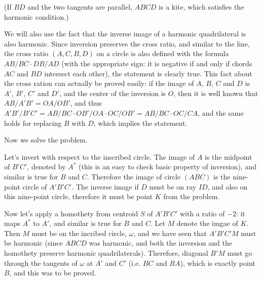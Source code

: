 \documentclass{article}
\begin{document}
(If \(\displaystyle BD\) and the two tangents are parallel, \(\displaystyle ABCD\) is a kite, which satisfies the harmonic condition.)

We will also use the fact that the inverse image of a harmonic quadrilateral is also harmonic. Since inversion preserves the cross ratio, and similar to the line, the cross ratio \(\displaystyle (A,C,B,D)\) on a circle is also defined with the formula \(\displaystyle AB/BC\cdot DB/AD\) (with the appropriate sign: it is negative if and only if chords \(\displaystyle AC\) and \(\displaystyle BD\) intersect each other), the statement is clearly true. This fact about the cross ration can actually be proved easily: if the image of \(\displaystyle A\), \(\displaystyle B\), \(\displaystyle C\) and \(\displaystyle D\) is \(\displaystyle A'\), \(\displaystyle B'\), \(\displaystyle C'\) and \(\displaystyle D'\), and the center of the inversion is \(\displaystyle O\), then it is well known that \(\displaystyle AB/A'B'=OA/OB'\), and thus \(\displaystyle A'B'/B'C'=AB/BC\cdot OB'/OA\cdot OC/OB'=AB/BC\cdot OC/CA\), and the same holds for replacing \(\displaystyle B\) with \(\displaystyle D\), which implies the statement.

Now we solve the problem.

Let's invert with respect to the inscribed circle. The image of \(\displaystyle A\) is the midpoint of \(\displaystyle B'C'\), denoted by \(\displaystyle A^*\) (this is an easy to check basic property of inversion), and similar is true for \(\displaystyle B\) and \(\displaystyle C\). Therefore the image of circle \(\displaystyle (ABC)\) is the nine-point circle of \(\displaystyle A'B'C'\). The inverse image if \(\displaystyle D\) must be on ray \(\displaystyle ID\), and also on this nine-point circle, therefore it must be point \(\displaystyle K\) from the problem.

Now let's apply a homothety from centroid \(\displaystyle S\) of \(\displaystyle A'B'C'\) with a ratio of \(\displaystyle -2\): it maps \(\displaystyle A^*\) to \(\displaystyle A'\), and similar is true for \(\displaystyle B\) and \(\displaystyle C\). Let \(\displaystyle M\) denote the imgae of \(\displaystyle K\). Then \(\displaystyle M\) must be on the incribed circle, \(\displaystyle \omega\), and we have seen that \(\displaystyle A'B'C'M\) must be harmonic (since \(\displaystyle ABCD\) was harmonic, and both the inversion and the homothety preserve harmonic quadrilaterals). Therefore, diagonal \(\displaystyle B'M\) must go through the tangents of \(\displaystyle \omega\) at \(\displaystyle A'\) and \(\displaystyle C'\) (i.e. \(\displaystyle BC\) and \(\displaystyle BA\)), which is exactly point \(\displaystyle B\), and this was to be proved.
\end{document}
